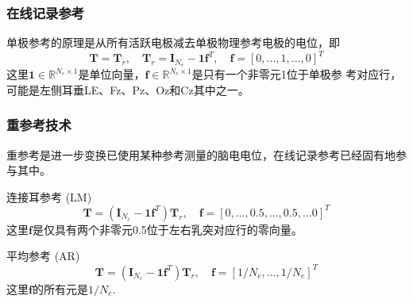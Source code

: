 \subsubsection{在线记录参考}
单极参考的原理是从所有活跃电极减去单极物理参考电极的电位，即
\begin{equation}\label{eq2.4}
\mathbf{T}=\mathbf{T}_{r},\quad\mathbf{T}_{r}=\mathbf{I}_{N_{e}}-\mathbf{1}\mathbf{f}^T,\quad\mathbf{f}=[0,...,1,...,0]^T
\end{equation}
这里$\mathbf{1}\in{\mathbb{R}^{N_e\times1}}$是单位向量，$\mathbf{f}\in{\mathbb{R}^{N_e\times1}}$是只有一个非零元1位于单极参
考对应行，可能是左侧耳垂LE、Fz、Pz、Oz和Cz其中之一。

\subsubsection{重参考技术}
重参考是进一步变换已使用某种参考测量的脑电电位，在线记录参考已经固有地参与其中。

连接耳参考 (LM)
\begin{equation}\label{eq2.5}
\mathbf{T}=(\mathbf{I}_{N_e}-\mathbf{1f}^T)\mathbf{T}_r,\quad\mathbf{f}=[0,...,0.5,...,0.5,...0]^T
\end{equation}
这里$\mathbf{f}$是仅具有两个非零元0.5位于左右乳突对应行的零向量。

平均参考 (AR)
\begin{equation}\label{eq2.6}
\mathbf{T}=(\mathbf{I}_{N_e}-\mathbf{1f}^T)\mathbf{T}_r,\quad\mathbf{f}=[1/{N_e},...,1/{N_e}]^T
\end{equation}
这里$\mathbf{f}$的所有元是$1/{N_e}$.

